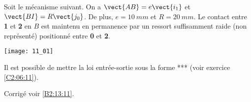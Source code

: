 \normaltrue \difficilefalse \tdifficilefalse
\correctionfalse


\setcounter{question}{0}
\ifcorrection
\else
{}
\fi

\ifprof
\else
Soit le mécanisme suivant. On a $\vect{AB}=e\vect{i_1}$ et $\vect{BI}=R\vect{j_0}$. De plus, 
$e=\SI{10}{mm}$ et $R=\SI{20}{mm}$. Le contact entre \textbf{1} et \textbf{2} en $B$ est maintenu en permanence par un ressort suffisamment raide (non représenté) positionné entre \textbf{0} et \textbf{2}. 
\begin{center}
\texttt{[image: 11\_01]}
\end{center}
\fi

Il est possible de mettre la loi entrée-sortie sous la forme *** (voir exercice \ref{C2:06:11}).

\ifprof
\else
\fi

\ifprof
\else
\fi

\ifprof
\else
\begin{flushright}
\footnotesize{Corrigé  voir \ref{B2:13:11}.}
\end{flushright}%
\fi